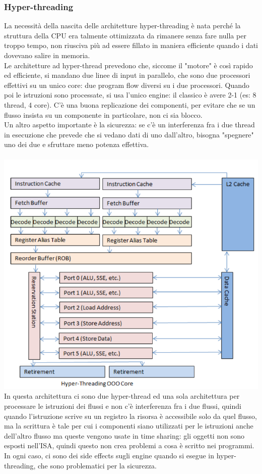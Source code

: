 \documentclass[12pt, oneside]{extbook}
\begin{document}
\subsubsection{Hyper-threading}
La necessità della nascita delle architetture hyper-threading è nata perché la struttura della CPU era talmente ottimizzata da rimanere senza fare nulla per troppo tempo, non riusciva più ad essere fillato in maniera efficiente quando i dati dovevano salire in memoria.\\ Le architetture ad hyper-thread prevedono che, siccome il "motore" è così rapido ed efficiente, si mandano due linee di input in parallelo, che sono due processori effettivi su un unico core: due program flow diversi su i due processori. Quando poi le istruzioni sono processate, si usa l'unico engine: il classico è avere 2-1 (es: 8 thread, 4 core). C'è una buona replicazione dei componenti, per evitare che se un flusso insista su un componente in particolare, non ci sia blocco.\\ Un altro aspetto importante è la sicurezza: se c'è un interferenza fra i due thread in esecuzione che prevede che si vedano dati di uno dall'altro, bisogna "spegnere" uno dei due e sfruttare meno potenza effettiva.
\\\\
\includegraphics[scale=0.3]{immagini/hypert-ooo}\\
In questa architettura ci sono due hyper-thread ed una sola architettura per processare le istruzioni dei flussi e non c'è interferenza fra i due flussi, quindi quando l'istruzione scrive su un registro la risorsa è accessibile solo da quel flusso, ma la scrittura è tale per cui i componenti siano utilizzati per le istruzioni anche dell'altro flusso ma queste vengono usate in time sharing: gli oggetti non sono esposti nell'ISA, quindi questo non crea problemi a cosa è scritto nei programmi. In ogni caso, ci sono dei side effects sugli engine quando si esegue in hyper-threading, che sono problematici per la sicurezza.
\end{document}
